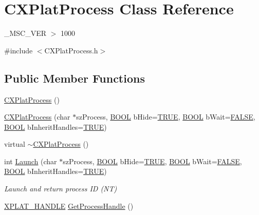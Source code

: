\hypertarget{class_c_x_plat_process}{\section{\-C\-X\-Plat\-Process \-Class \-Reference}
\label{class_c_x_plat_process}
}


\-\_\-\-M\-S\-C\-\_\-\-V\-E\-R $>$ 1000  




{\ttfamily \#include $<$\-C\-X\-Plat\-Process.\-h$>$}

\subsection*{\-Public \-Member \-Functions}
\begin{DoxyCompactItemize}
\item 
\hyperlink{class_c_x_plat_process_ad31bcf12947c3e94d3d08e3e04b5f009}{\-C\-X\-Plat\-Process} ()
\item 
\hyperlink{class_c_x_plat_process_adbba672243c0f6031ad3acc6a0742725}{\-C\-X\-Plat\-Process} (char $\ast$sz\-Process, \hyperlink{_cpclient_8h_a3be13892ae7076009afcf121347dd319}{\-B\-O\-O\-L} b\-Hide=\hyperlink{_x_plat_8h_aa8cecfc5c5c054d2875c03e77b7be15d}{\-T\-R\-U\-E}, \hyperlink{_cpclient_8h_a3be13892ae7076009afcf121347dd319}{\-B\-O\-O\-L} b\-Wait=\hyperlink{_x_plat_8h_aa93f0eb578d23995850d61f7d61c55c1}{\-F\-A\-L\-S\-E}, \hyperlink{_cpclient_8h_a3be13892ae7076009afcf121347dd319}{\-B\-O\-O\-L} b\-Inherit\-Handles=\hyperlink{_x_plat_8h_aa8cecfc5c5c054d2875c03e77b7be15d}{\-T\-R\-U\-E})
\item 
virtual \hyperlink{class_c_x_plat_process_a2d556f26349a1c42d2a851ba15985a8c}{$\sim$\-C\-X\-Plat\-Process} ()
\item 
int \hyperlink{class_c_x_plat_process_aadd87f5c163cbbdceb47607e7e72b462}{\-Launch} (char $\ast$sz\-Process, \hyperlink{_cpclient_8h_a3be13892ae7076009afcf121347dd319}{\-B\-O\-O\-L} b\-Hide=\hyperlink{_x_plat_8h_aa8cecfc5c5c054d2875c03e77b7be15d}{\-T\-R\-U\-E}, \hyperlink{_cpclient_8h_a3be13892ae7076009afcf121347dd319}{\-B\-O\-O\-L} b\-Wait=\hyperlink{_x_plat_8h_aa93f0eb578d23995850d61f7d61c55c1}{\-F\-A\-L\-S\-E}, \hyperlink{_cpclient_8h_a3be13892ae7076009afcf121347dd319}{\-B\-O\-O\-L} b\-Inherit\-Handles=\hyperlink{_x_plat_8h_aa8cecfc5c5c054d2875c03e77b7be15d}{\-T\-R\-U\-E})
\begin{DoxyCompactList}\small\item\em \-Launch and return process \-I\-D (\-N\-T) \end{DoxyCompactList}\item 
\hyperlink{_x_plat_8h_af3c5c1485bb09f4be888d78cdaf93e00}{\-X\-P\-L\-A\-T\-\_\-\-H\-A\-N\-D\-L\-E} \hyperlink{class_c_x_plat_process_a498f7e51e46120ab44bce6951e5cccb3}{\-Get\-Process\-Handle} ()
\end{DoxyCompactItemize}
